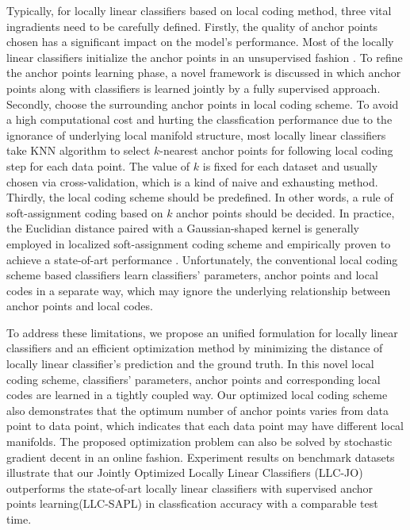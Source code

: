 \documentclass{llncs}
\begin{document}
	Typically, for locally linear classifiers based on local coding method, three vital ingradients need to be carefully defined. Firstly, the quality of anchor points chosen has a significant impact on the model's performance. Most of the locally linear classifiers initialize the anchor points in an unsupervised fashion \cite{2} \cite{5}. To refine the anchor points learning phase, a novel framework is discussed \cite{4} in which anchor points along with classifiers is learned jointly by a fully supervised approach. Secondly, choose the surrounding anchor points in local coding scheme. To avoid a high computational cost and hurting the classfication performance due to the ignorance of underlying local manifold structure, most locally linear classifiers \cite{2} \cite{4} take KNN algorithm \cite{7} to select $k$-nearest anchor points for following local coding step for each data point. The value of $k$ is fixed for each dataset and usually chosen via cross-validation, which is a kind of naive and exhausting method. Thirdly, the local coding scheme should be predefined. In other words, a rule of soft-assignment coding based on $k$ anchor points should be decided. In practice, the Euclidian distance paired with a Gaussian-shaped kernel \cite{8} \cite{9} is generally employed in localized soft-assignment coding scheme and empirically proven to achieve a state-of-art performance \cite{2} \cite{4}. Unfortunately, the conventional local coding scheme based classifiers learn classifiers' parameters, anchor points and local codes in a separate way, which may ignore the underlying relationship between anchor points and local codes.
	
	To address these limitations, we propose an unified formulation for locally linear classifiers  and an efficient optimization method by minimizing the distance of locally linear classifier's prediction and the ground truth. In this novel local coding scheme, classifiers' parameters, anchor points and corresponding local codes are learned in a tightly coupled way. Our optimized local coding scheme also demonstrates that the optimum number of anchor points varies from data point to data point, which indicates that each data point may have different local manifolds. The proposed optimization problem can also be solved by stochastic gradient decent in an online fashion. Experiment results on benchmark datasets illustrate that our Jointly Optimized Locally Linear Classifiers (LLC-JO) outperforms the state-of-art locally linear classifiers with supervised anchor points learning(LLC-SAPL) \cite{4} in classfication accuracy with a comparable test time.
\end{document}
